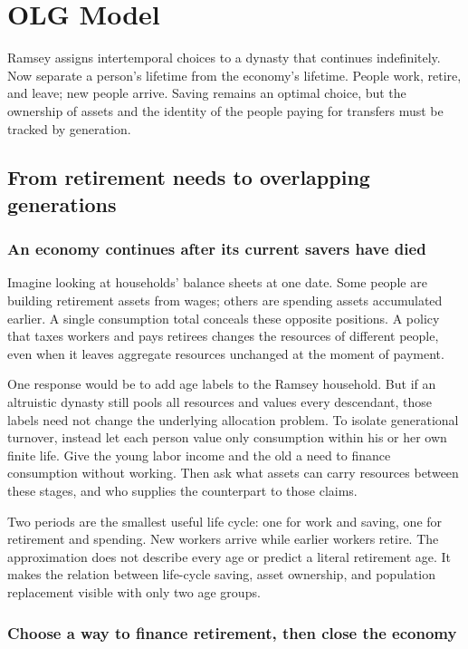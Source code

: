\section{OLG Model}\label{sec:olg}

Ramsey assigns intertemporal choices to a dynasty that continues indefinitely.
Now separate a person's lifetime from the economy's lifetime. People work,
retire, and leave; new people arrive. Saving remains an optimal choice, but
the ownership of assets and the identity of the people paying for transfers
must be tracked by generation.

\subsection{From retirement needs to overlapping generations}

\subsubsection{An economy continues after its current savers have died}

Imagine looking at households' balance sheets at one date. Some people are
building retirement assets from wages; others are spending assets accumulated
earlier. A single consumption total conceals these opposite positions. A policy
that taxes workers and pays retirees changes the resources of different people,
even when it leaves aggregate resources unchanged at the moment of payment.

One response would be to add age labels to the Ramsey household. But if an
altruistic dynasty still pools all resources and values every descendant,
those labels need not change the underlying allocation problem. To isolate
generational turnover, instead let each person value only consumption within
his or her own finite life. Give the young labor income and the old a need to
finance consumption without working. Then ask what assets can carry resources
between these stages, and who supplies the counterpart to those claims.

Two periods are the smallest useful life cycle: one for work and saving, one
for retirement and spending. New workers arrive while earlier workers retire.
The approximation does not describe every age or predict a literal retirement
age. It makes the relation between life-cycle saving, asset ownership, and
population replacement visible with only two age groups.

\subsubsection{Choose a way to finance retirement, then close the economy}

